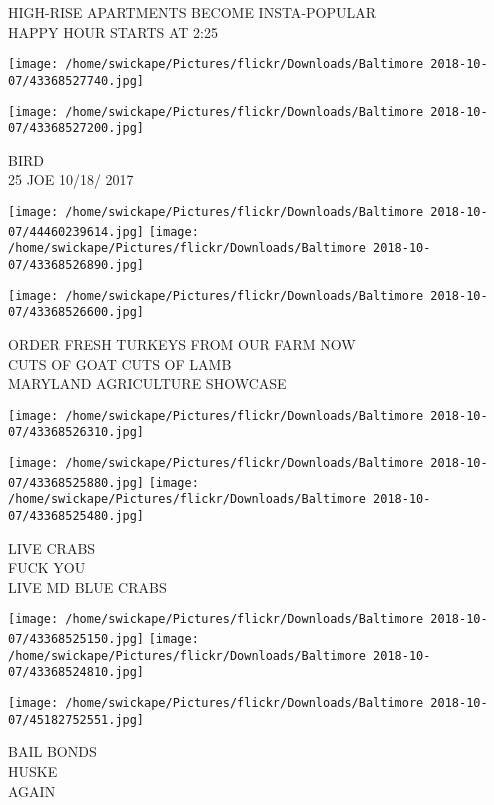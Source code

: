 \documentclass[10pt,letterpaper]{article}
\begin{document}
HIGH{-}RISE APARTMENTS BECOME INSTA{-}POPULAR\\
HAPPY HOUR STARTS AT 2:25\\
\pagebreak

\texttt{[image: /home/swickape/Pictures/flickr/Downloads/Baltimore 2018-10-07/43368527740.jpg]}

\vspace{0.25in}
\texttt{[image: /home/swickape/Pictures/flickr/Downloads/Baltimore 2018-10-07/43368527200.jpg]}

BIRD\\
25 JOE 10/18/ 2017\\
\pagebreak

\texttt{[image: /home/swickape/Pictures/flickr/Downloads/Baltimore 2018-10-07/44460239614.jpg]}
\texttt{[image: /home/swickape/Pictures/flickr/Downloads/Baltimore 2018-10-07/43368526890.jpg]}

\vspace{0.25in}
\texttt{[image: /home/swickape/Pictures/flickr/Downloads/Baltimore 2018-10-07/43368526600.jpg]}

ORDER FRESH TURKEYS FROM OUR FARM NOW\\
CUTS OF GOAT CUTS OF LAMB\\
MARYLAND AGRICULTURE SHOWCASE\\
\pagebreak

\texttt{[image: /home/swickape/Pictures/flickr/Downloads/Baltimore 2018-10-07/43368526310.jpg]}

\vspace{0.25in}
\texttt{[image: /home/swickape/Pictures/flickr/Downloads/Baltimore 2018-10-07/43368525880.jpg]}
\texttt{[image: /home/swickape/Pictures/flickr/Downloads/Baltimore 2018-10-07/43368525480.jpg]}

LIVE CRABS\\
FUCK YOU\\
LIVE MD BLUE CRABS\\
\pagebreak

\texttt{[image: /home/swickape/Pictures/flickr/Downloads/Baltimore 2018-10-07/43368525150.jpg]}
\texttt{[image: /home/swickape/Pictures/flickr/Downloads/Baltimore 2018-10-07/43368524810.jpg]}

\texttt{[image: /home/swickape/Pictures/flickr/Downloads/Baltimore 2018-10-07/45182752551.jpg]}

BAIL BONDS\\
HUSKE\\
AGAIN\\
\pagebreak
\end{document}
